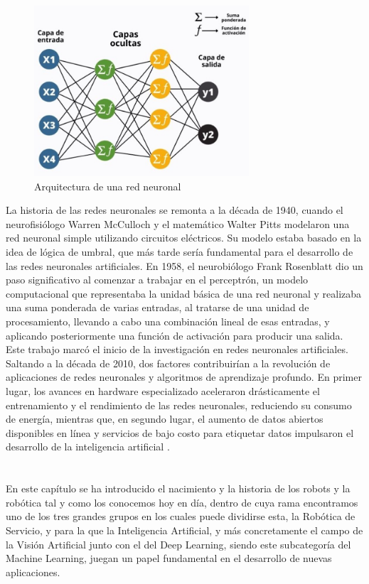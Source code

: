 \begin{figure} [h!]
    \begin{center}
      \includegraphics[width=8cm]{figs/capas rrnn.jpeg}
    \end{center}
    \caption{Arquitectura de una red neuronal}
    \label{fig:Arquitectura red neuronal}
\end{figure}

La historia de las redes neuronales se remonta a la década de 1940, cuando el neurofisiólogo Warren McCulloch y el matemático Walter Pitts modelaron una red neuronal simple utilizando circuitos eléctricos. Su modelo estaba basado en la idea de lógica de umbral, que más tarde sería fundamental para el desarrollo de las redes neuronales artificiales. En 1958, el neurobiólogo Frank Rosenblatt dio un paso significativo al comenzar a trabajar en el perceptrón, un modelo computacional que representaba la unidad básica de una red neuronal y realizaba una suma ponderada de varias entradas, al tratarse de una unidad de procesamiento, llevando a cabo una combinación lineal de esas entradas, y aplicando posteriormente una función de activación para producir una salida. Este trabajo marcó el inicio de la investigación en redes neuronales artificiales. Saltando a la década de 2010, dos factores contribuirían a la revolución de aplicaciones de redes neuronales y algoritmos de aprendizaje profundo. En primer lugar, los avances en hardware especializado aceleraron drásticamente el entrenamiento y el rendimiento de las redes neuronales, reduciendo su consumo de energía, mientras que, en segundo lugar, el aumento de datos abiertos disponibles en línea y servicios de bajo costo para etiquetar datos impulsaron el desarrollo de la inteligencia artificial \cite{Abeliuk21}.\\\\
\\

En este capítulo se ha introducido el nacimiento y la historia de los robots y la robótica tal y como los conocemos hoy en día, dentro de cuya rama encontramos uno de los tres grandes grupos en los cuales puede dividirse esta, la Robótica de Servicio, y para la que la Inteligencia Artificial, y más concretamente el campo de la Visión Artificial junto con el del Deep Learning, siendo este subcategoría del Machine Learning, juegan un papel fundamental en el desarrollo de nuevas aplicaciones.\\

